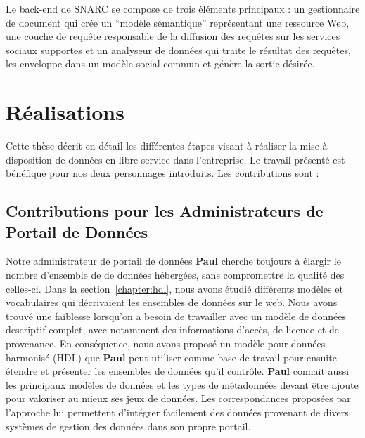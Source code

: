 Le back-end de SNARC se compose de trois \'{e}l\'{e}ments principaux : un gestionnaire de document qui cr\'{e}e un ``mod\`{e}le s\'{e}mantique'' repr\'{e}sentant une ressource Web, une couche de requ\^{e}te responsable de la diffusion des requ\^{e}tes sur les services sociaux supportes et un analyseur de donn\'{e}es qui traite le r\'{e}sultat des requ\^{e}tes, les enveloppe dans un mod\`{e}le social commun et g\'{e}n\`{e}re la sortie d\'{e}sir\'{e}e.


\section{R\'{e}alisations}

Cette th\`{e}se d\'{e}crit en d\'{e}tail les diff\'{e}rentes \'{e}tapes visant \`{a} r\'{e}aliser la mise \`{a} disposition de donn\'{e}es en libre-service dans l'entreprise. Le travail pr\'{e}sent\'{e} est b\'{e}n\'{e}fique pour nos deux personnages introduits. Les contributions sont : \\

\subsection{Contributions pour les Administrateurs de Portail de Donn\'{e}es}

Notre administrateur de portail de donn\'{e}es \textbf{Paul} cherche toujours \`{a} \'{e}largir le nombre d'ensemble de de donn\'{e}es h\'{e}berg\'{e}es, sans compromettre la qualit\'{e} des celles-ci. Dans la section~\ref{chapter:hdl}, nous avons \'{e}tudi\'{e} diff\'{e}rents mod\`{e}les et vocabulaires qui d\'{e}crivaient les ensembles de donn\'{e}es sur le web. Nous avons trouv\'{e} une faiblesse lorsqu'on a besoin de travailler avec un mod\`{e}le de donn\'{e}es descriptif complet, avec notamment des informations d'acc\`{e}s, de licence et de provenance. En cons\'{e}quence, nous avons propos\'{e} un mod\`{e}le pour donn\'{e}es harmonis\'{e} (HDL) que \textbf{Paul} peut utiliser comme base de travail pour ensuite \'{e}tendre et pr\'{e}senter les ensembles de donn\'{e}es qu'il contr\^{o}le. \textbf{Paul} connait aussi les principaux mod\`{e}les de donn\'{e}es et les types de m\'{e}tadonn\'{e}es devant \^{e}tre ajoute pour valoriser au mieux ses jeux de donn\'{e}es. Les correspondances propos\'{e}es par l'approche lui permettent d'int\'{e}grer facilement des donn\'{e}es provenant de divers syst\`{e}mes de gestion des donn\'{e}es dans son propre portail.

